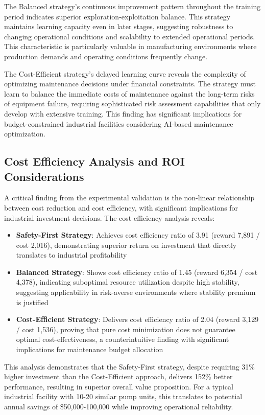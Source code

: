\documentclass[twocolumn]{article}
\begin{document}
The Balanced strategy's continuous improvement pattern throughout the training period indicates superior exploration-exploitation balance. This strategy maintains learning capacity even in later stages, suggesting robustness to changing operational conditions and scalability to extended operational periods. This characteristic is particularly valuable in manufacturing environments where production demands and operating conditions frequently change.

The Cost-Efficient strategy's delayed learning curve reveals the complexity of optimizing maintenance decisions under financial constraints. The strategy must learn to balance the immediate costs of maintenance against the long-term risks of equipment failure, requiring sophisticated risk assessment capabilities that only develop with extensive training. This finding has significant implications for budget-constrained industrial facilities considering AI-based maintenance optimization.

\subsection{Cost Efficiency Analysis and ROI Considerations}

A critical finding from the experimental validation is the non-linear relationship between cost reduction and cost efficiency, with significant implications for industrial investment decisions. The cost efficiency analysis reveals:

\begin{itemize}
\item \textbf{Safety-First Strategy}: Achieves cost efficiency ratio of 3.91 (reward 7,891 / cost 2,016), demonstrating superior return on investment that directly translates to industrial profitability
\item \textbf{Balanced Strategy}: Shows cost efficiency ratio of 1.45 (reward 6,354 / cost 4,378), indicating suboptimal resource utilization despite high stability, suggesting applicability in risk-averse environments where stability premium is justified
\item \textbf{Cost-Efficient Strategy}: Delivers cost efficiency ratio of 2.04 (reward 3,129 / cost 1,536), proving that pure cost minimization does not guarantee optimal cost-effectiveness, a counterintuitive finding with significant implications for maintenance budget allocation
\end{itemize}

This analysis demonstrates that the Safety-First strategy, despite requiring 31\% higher investment than the Cost-Efficient approach, delivers 152\% better performance, resulting in superior overall value proposition. For a typical industrial facility with 10-20 similar pump units, this translates to potential annual savings of \$50,000-100,000 while improving operational reliability.
\end{document}
